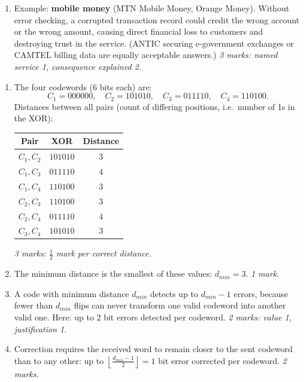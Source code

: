 \documentclass[11pt]{article}
\begin{document}
\begin{corrige}
\begin{enumerate}
\item Example: \textbf{mobile money} (MTN Mobile Money, Orange Money). Without error checking, a corrupted transaction record could credit the wrong account or the wrong amount, causing direct financial loss to customers and destroying trust in the service. (ANTIC securing e-government exchanges or CAMTEL billing data are equally acceptable answers.) \hfill \emph{3 marks: named service 1, consequence explained 2.}
\end{enumerate}
\end{corrige}

\begin{corrige}
\begin{enumerate}
\item The four codewords (6 bits each) are:
\[ C_1 = 000000,\quad C_2 = 101010,\quad C_3 = 011110,\quad C_4 = 110100. \]
Distances between all pairs (count of differing positions, i.e.\ number of 1s in the XOR):
\begin{center}
\begin{tabular}{|c|c|c|}
\hline
\rowcolor{popblueL} Pair & XOR & Distance \\
\hline
$C_1, C_2$ & $101010$ & $3$ \\
\hline
$C_1, C_3$ & $011110$ & $4$ \\
\hline
$C_1, C_4$ & $110100$ & $3$ \\
\hline
$C_2, C_3$ & $110100$ & $3$ \\
\hline
$C_2, C_4$ & $011110$ & $4$ \\
\hline
$C_3, C_4$ & $101010$ & $3$ \\
\hline
\end{tabular}
\end{center}
\hfill \emph{3 marks: $\frac{1}{2}$ mark per correct distance.}
\item The minimum distance is the smallest of these values: $\boxed{d_{min} = 3}$. \hfill \emph{1 mark.}
\item A code with minimum distance $d_{min}$ detects up to $d_{min} - 1$ errors, because fewer than $d_{min}$ flips can never transform one valid codeword into another valid one. Here: up to $\boxed{2}$ bit errors detected per codeword. \hfill \emph{2 marks: value 1, justification 1.}
\item Correction requires the received word to remain closer to the sent codeword than to any other: up to $\left\lfloor \frac{d_{min}-1}{2} \right\rfloor = \boxed{1}$ bit error corrected per codeword. \hfill \emph{2 marks.}

\end{enumerate}
\end{corrige}
\end{document}
